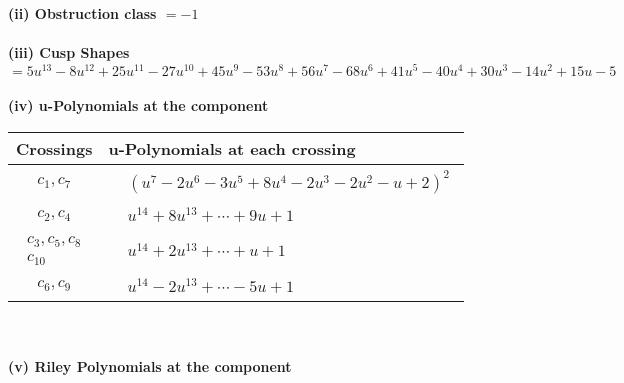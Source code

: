 \documentclass[1p]{elsarticle_modified}
\theoremstyle{definition}
\begin{document}
\flushleft \textbf{(ii) Obstruction class $= -1$}\\~\\
\flushleft \textbf{(iii) Cusp Shapes $= 5 u^{13}-8 u^{12}+25 u^{11}-27 u^{10}+45 u^9-53 u^8+56 u^7-68 u^6+41 u^5-40 u^4+30 u^3-14 u^2+15 u-5$}\\~\\
\newpage\renewcommand{\arraystretch}{1}
\flushleft \textbf{(iv) u-Polynomials at the component}\newline \\
\begin{tabular}{m{50pt}|m{274pt}}
Crossings & \hspace{64pt}u-Polynomials at each crossing \\
\hline $$\begin{aligned}c_{1},c_{7}\end{aligned}$$&$\begin{aligned}
&(u^7-2 u^6-3 u^5+8 u^4-2 u^3-2 u^2- u+2)^2
\end{aligned}$\\
\hline $$\begin{aligned}c_{2},c_{4}\end{aligned}$$&$\begin{aligned}
&u^{14}+8 u^{13}+\cdots+9 u+1
\end{aligned}$\\
\hline $$\begin{aligned}c_{3},c_{5},c_{8}\\c_{10}\end{aligned}$$&$\begin{aligned}
&u^{14}+2 u^{13}+\cdots+u+1
\end{aligned}$\\
\hline $$\begin{aligned}c_{6},c_{9}\end{aligned}$$&$\begin{aligned}
&u^{14}-2 u^{13}+\cdots-5 u+1
\end{aligned}$\\
\hline
\end{tabular}\\~\\
\newpage\renewcommand{\arraystretch}{1}
\flushleft \textbf{(v) Riley Polynomials at the component}\newline \\
\end{document}

